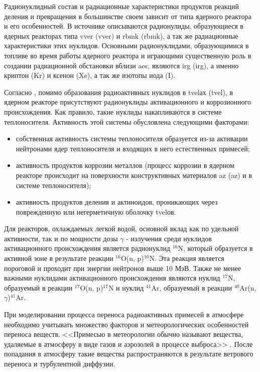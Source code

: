 Радионуклидный состав и радиационные характеристики продуктов реакций деления и превращения в большинстве своем зависит 
от типа ядерного реактора и его особенностей. В источнике \cite{gusev_bio} описываются радионулиды, образующиеся в 
ядерных реакторах типа \ac{vver} (\acl{vver}) и \ac{rbmk} (\acl{rbmk}), а так же радиационные характеристики этих нуклидов. 
Основными радионуклидами, образующимися в топливе во время работы ядерного реактора и играющими существенную роль в 
создании радиационной обстановки вблизи \ac{aes}, являются \ac{irg} (\acl{irg}), а именно криптон (Kr) и ксенон (Xe), 
а так же изотопы иода (I).

Согласно \cite{gusev_bio, gusev_def, egorov}, помимо образования радиоактивных нуклидов в \ac{tvel}ах (\acl{tvel}), 
в ядерном реакторе присутствуют радионуклиды активационного и коррозионного происхождения. Как правило, такие нуклиды 
накапливаются в системе теплоносителя. Активность этой системы обусловлена следующими факторами:

\begin{itemize}
	\item собственная активность системы теплоносителя образуется из-за активации нейтронами ядер теплоносителя и 
		входящих в него естественных примесей;
	\item активность продуктов коррозии металлов (процесс коррозии в ядерном реакторе происходит на поверхности 
		конструктивных материалов \ac{az} (\acl{az}) и в системе теплоносителя);
	\item активность продуктов деления и актиноидов, проникающих через поврежденную или негерметичную оболочку \ac{tvel}ов.
\end{itemize}
Для реакторов, охлаждаемых легкой водой, основной вклад как по удельной активности, так и по мощности дозы $\gamma$ - 
излучения среди нуклидов активационного происхождения является радионуклид $^{16}\text{N}$, который образуется в
активной зоне в результате реакции $^{16}\text{O}$(n, p)$^{16}\text{N}$. Эта реакция является 
пороговой и проходит при энергии нейтронов выше 10 МэВ. Также не менее важными нуклидами активационного происхождения 
являются нуклид $^{17}\text{N}$, образуемый в реакции $^{17}\text{O}$(n, p)$^{17}\text{N}$ и нуклид $^{41}\text{Ar}$, 
образуемый в реакции $^{40}\text{Ar}$(n, $\gamma$)$^{41}\text{Ar}$.

При моделировании процесса переноса радиоактивных примесей в атмосфере необходимо учитывать множество факторов и 
метеорологических особенностей переноса веществ. <<Примесью в метеорологии обычно называют вещества, удаляемые в 
атмосферу в виде газов и  аэрозолей в процессе выброса>> \cite[с. 52]{gusev_bio}. После попадания в атмосферу такие 
вещества распространяются в результате ветрового переноса и турбулентной диффузии. 

